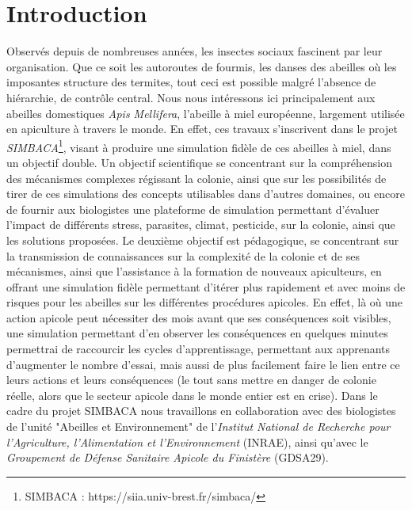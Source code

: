 \chapter*{Introduction}


	Observés depuis de nombreuses années, les insectes sociaux fascinent par leur organisation. Que ce soit les autoroutes de fourmis, les danses des abeilles où les imposantes structure des termites, tout ceci est possible malgré l'absence de hiérarchie, de contrôle central. Nous nous intéressons ici principalement aux abeilles domestiques \textit{Apis Mellifera}, l'abeille à miel européenne, largement utilisée en apiculture à travers le monde. 
	En effet, ces travaux s'inscrivent dans le projet \textit{SIMBACA}\footnote{SIMBACA : https://siia.univ-brest.fr/simbaca/}, visant à produire une simulation fidèle de ces abeilles à miel, dans un objectif double. Un objectif scientifique se concentrant sur la compréhension des mécanismes complexes régissant la colonie, ainsi que sur les possibilités de tirer de ces simulations des concepts utilisables dans d'autres domaines, ou encore de fournir aux biologistes une plateforme de simulation permettant d'évaluer l'impact de différents stress, parasites, climat, pesticide, sur la colonie, ainsi que les solutions proposées. 
	Le deuxième objectif est pédagogique, se concentrant sur la transmission de connaissances sur la complexité de la colonie et de ses mécanismes, ainsi que l'assistance à la formation de nouveaux apiculteurs, en offrant une simulation fidèle permettant d'itérer plus rapidement et avec moins de risques pour les abeilles sur les différentes procédures apicoles. En effet, là où une action apicole peut nécessiter des mois avant que ses conséquences soit visibles, une simulation permettant d'en observer les conséquences en quelques minutes permettrai de raccourcir les cycles d'apprentissage, permettant aux apprenants d'augmenter le nombre d'essai, mais aussi de plus facilement faire le lien entre ce leurs actions et leurs conséquences (le tout sans mettre en danger de colonie réelle, alors que le secteur apicole dans le monde entier est en crise\cite{johnson_honey_2010}). Dans le cadre du projet SIMBACA nous travaillons en collaboration avec des biologistes de l'unité "Abeilles et Environnement" de l'\textit{Institut National de Recherche pour l'Agriculture, l'Alimentation et l'Environnement} (INRAE), ainsi qu'avec le \textit{Groupement de Défense Sanitaire Apicole du Finistère} (GDSA29).

